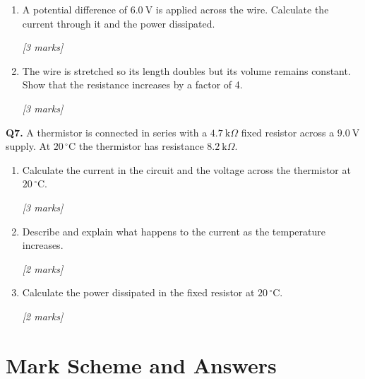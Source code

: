 \begin{tcolorbox}[colback=white, colframe=midblue, breakable]
\begin{minipage}{\linewidth}
\begin{enumerate}[label=(\alph*)]
  \item A potential difference of $6.0\ \text{V}$ is applied across the wire. Calculate the current through it and the power dissipated.
  \par\hfill\textit{[3 marks]}
  \vspace{3.5cm}

  \item The wire is stretched so its length doubles but its volume remains constant. Show that the resistance increases by a factor of 4.
  \par\hfill\textit{[3 marks]}
  \vspace{4cm}
\end{enumerate}
\end{minipage}

\begin{minipage}{\linewidth}
\textbf{Q7.} A thermistor is connected in series with a $4.7\ \text{k}\Omega$ fixed resistor across a $9.0\ \text{V}$ supply. At $20\,^\circ\text{C}$ the thermistor has resistance $8.2\ \text{k}\Omega$.

\begin{enumerate}[label=(\alph*)]
  \item Calculate the current in the circuit and the voltage across the thermistor at $20\,^\circ\text{C}$.
  \par\hfill\textit{[3 marks]}
  \vspace{3.5cm}

  \item Describe and explain what happens to the current as the temperature increases.
  \par\hfill\textit{[2 marks]}
  \vspace{3cm}

  \item Calculate the power dissipated in the fixed resistor at $20\,^\circ\text{C}$.
  \par\hfill\textit{[2 marks]}
  \vspace{3cm}
\end{enumerate}
\end{minipage}

\end{tcolorbox}


\pagebreak

\section{Mark Scheme and Answers}

